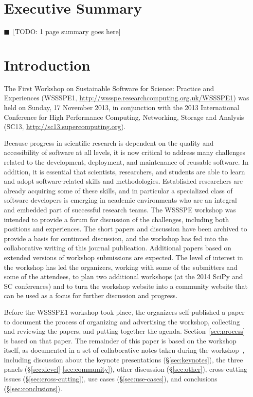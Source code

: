 \documentclass[11pt, oneside]{amsart}
\newcommand{\todo}[1]{{\color{blue}$\blacksquare$~\textsf{[TODO: #1]}}}
\begin{document}
\pagebreak

\section*{Executive Summary}

\todo{1 page summary goes here}

\pagebreak

\section{Introduction}

The First Workshop on Sustainable Software for Science: Practice and Experiences (WSSSPE1, \url{http://wssspe.researchcomputing.org.uk/WSSSPE1}) was held on Sunday, 17 November 2013, in conjunction with the 2013 International Conference for High Performance Computing, Networking, Storage and Analysis (SC13, \url{http://sc13.supercomputing.org}).

Because progress in scientific research is dependent on the quality and accessibility
of software at all levels, it is now critical to address many challenges related to the
development, deployment, and maintenance of reusable software. In addition, it is
essential that scientists, researchers, and students are able to learn and adopt
software-related skills and methodologies. Established researchers are already
acquiring some of these skills, and in particular a specialized class of software
developers is emerging in academic environments who are an integral and embedded
part of successful research teams. The WSSSPE workshop was intended to provide a
forum for discussion of the challenges, including both positions and experiences.
The short papers and discussion have been archived to provide a basis for continued
discussion, and the workshop has fed into the collaborative writing of this journal publication.
Additional papers based on extended versions of workshop submissions are expected.
The level of interest in the workshop has led the organizers, working with some of the submitters
and some of the attendees, to plan two additional workshops (at the 2014 SciPy and SC conferences) and to turn
the workshop website into a community website that can be used as a focus for further
discussion and progress.

Before the WSSSPE1 workshop took place, the organizers self-published a paper~\cite{WSSSPE1-pre-report} to document the process of organizing and advertising the workshop, collecting and reviewing the papers, and putting together the agenda.  Section~\ref{sec:process} is based on that paper.  The remainder of this paper is based on the workshop itself, as documented in a set of collaborative notes taken during the workshop~\cite{WSSSPE1-google-notes}, including discussion about the keynote presentations (\S\ref{sec:keynotes}), the three panels (\S\ref{sec:devel}-\ref{sec:community}), other discussion (\S\ref{sec:other}), cross-cutting issues (\S\ref{sec:cross-cutting}), use cases (\S\ref{sec:use-cases}), and conclusions (\S\ref{sec:conclusions}).
\end{document}
